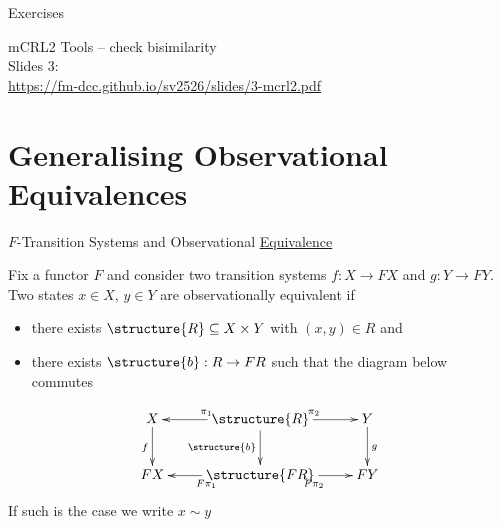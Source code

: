 \documentclass[aspectratio=169]{beamer}
\begin{document}
\begin{slide}{Exercises}


\end{slide}


\begin{frame}
  \huge\centering
  mCRL2 Tools -- check bisimilarity
  \\[5mm]\large
  Slides 3:\\\url{https://fm-dcc.github.io/sv2526/slides/3-mcrl2.pdf}
\end{frame}





\section{Generalising Observational Equivalences}

\begin{frame}{$F$-Transition Systems and Observational \underline{Equivalence}}

  \begin{definition}
    Fix a functor $F$ and consider two transition systems
    $f : X \to F X$ and $g : Y \to F Y$. Two states $x \in X$, $y \in Y$
    are \alert{observationally equivalent if}
      \begin{itemize}
         \item there exists 
      $\structure{R} \subseteq X \times Y$ with $(x,y) \in R$ and
         \item there exists  $\structure{b} : R \to FR$ such that the diagram below commutes
       \end{itemize} 
    \[
      \xymatrix{
        X \ar[d]_{f} & \ar[l]_{\pi_1}  \structure{R} \ar[r]^{\pi_2} \ar[d]_{\structure{b}} & Y \ar[d]^{g} \\
        F X  & \ar[l]^{F \pi_1} \structure{FR} \ar[r]_{F \pi_2} & F Y
        }
    \]
    If such is the case we write \alert{$x \sim y$}  
  \end{definition}
\end{frame}
\end{document}
